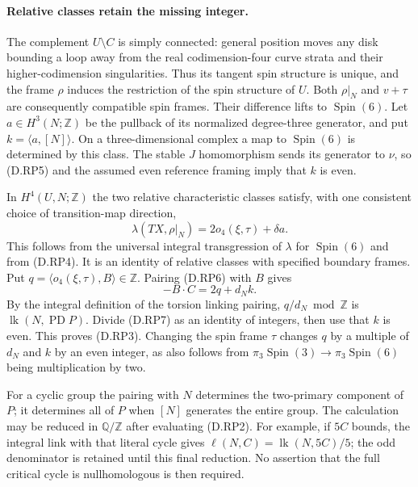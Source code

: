 \paragraph{Relative classes retain the missing integer.}
The complement $U\setminus C$ is simply connected: general
position moves any disk bounding a loop away from the real
codimension-four curve strata and their higher-codimension
singularities. Thus its tangent spin structure is unique, and
the frame $\rho$ induces the restriction of the spin structure
of $U$. Both $\rho|_N$ and $v+\tau$ are consequently compatible
spin frames. Their difference lifts to $\operatorname{Spin}(6)$.
Let $a\in H^3(N;\mathbb Z)$ be the pullback of its normalized
degree-three generator, and put $k=\langle a,[N]\rangle$.
On a three-dimensional complex a map to $\operatorname{Spin}(6)$
is determined by this class. The stable $J$ homomorphism sends
its generator to $\nu$, so (D.RP5) and the assumed even
reference framing imply that $k$ is even.

In $H^4(U,N;\mathbb Z)$ the two relative characteristic
classes satisfy, with one consistent choice of transition-map
direction,
\[
 \lambda(TX,\rho|_N)
       =2o_4(\xi,\tau)+\delta a.
\tag{D.RP6}
\]
This follows from the universal integral transgression of
$\lambda$ for $\operatorname{Spin}(6)$ and from (D.RP4).
It is an identity of relative classes with specified boundary
frames. Put $q=\langle o_4(\xi,\tau),B\rangle\in\mathbb Z$.
Pairing (D.RP6) with $B$ gives
\[
                        -B\cdot C=2q+d_Nk.
\tag{D.RP7}
\]
By the integral definition of the torsion linking pairing,
$q/d_N\bmod\mathbb Z$ is
$\operatorname{lk}(N,\operatorname{PD}P)$. Divide (D.RP7) as an
identity of integers, then use that $k$ is even. This proves
(D.RP3). Changing the spin frame $\tau$ changes $q$ by a multiple
of $d_N$ and $k$ by an even integer, as also follows from
$\pi_3\operatorname{Spin}(3)\to\pi_3\operatorname{Spin}(6)$
being multiplication by two.

For a cyclic group the pairing with $N$ determines the
two-primary component of $P$; it determines all of $P$ when
$[N]$ generates the entire group. The calculation may be reduced in $\mathbb Q/\mathbb Z$
after evaluating (D.RP2). For example, if $5C$ bounds, the
integral link with that literal cycle gives
$\ell(N,C)=\operatorname{lk}(N,5C)/5$; the odd denominator is
retained until this final reduction. No assertion that the full
critical cycle is nullhomologous is then required.

